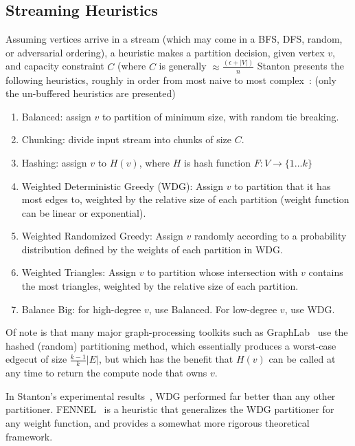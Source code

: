 \documentclass[11pt]{article}
\begin{document}
\subsection{Streaming Heuristics}
Assuming vertices arrive in a stream (which may come in a BFS, DFS, random, or adversarial ordering), a heuristic makes a partition decision, given vertex $v$, and capacity constraint $C$ (where $C$ is generally $\approx \frac{(\epsilon+|V|)}{n}$ Stanton presents the following heuristics, roughly in order from most naive to most complex~\cite{Stanton:2012:SGP:2339530.2339722}: (only the un-buffered heuristics are presented)

\begin{enumerate}
\item Balanced: assign $v$ to partition of minimum size, with random tie breaking.
\item Chunking: divide input stream into chunks of size $C$.
\item Hashing: assign $v$ to $H(v)$, where $H$ is hash function $F:V\to\{1\dots k\}$
\item Weighted Deterministic Greedy (WDG): Assign $v$ to partition that it has most edges to, weighted by the relative size of each partition (weight function can be linear or exponential).
\item Weighted Randomized Greedy: Assign $v$ randomly according to a probability distribution defined by the weights of each partition in WDG.
\item Weighted Triangles: Assign $v$ to partition whose intersection with $v$ contains the most triangles, weighted by the relative size of each partition.
\item Balance Big: for high-degree $v$, use Balanced. For low-degree $v$, use WDG. 
\end{enumerate}

Of note is that many major graph-processing toolkits such as GraphLab~\cite{Low:2012:DGF:2212351.2212354} use the hashed (random) partitioning method, which essentially produces a worst-case edgecut of size $\frac{k-1}{k}|E|$, but which has the benefit that $H(v)$ can be called at any time to return the compute node that owns $v$. 

In Stanton's experimental results~\cite{Stanton:2012:SGP:2339530.2339722}, WDG performed far better than any other partitioner. FENNEL~\cite{tsourakakis2012fennel} is a heuristic that generalizes the WDG partitioner for any weight function, and provides a somewhat more rigorous theoretical framework. 
\end{document}
